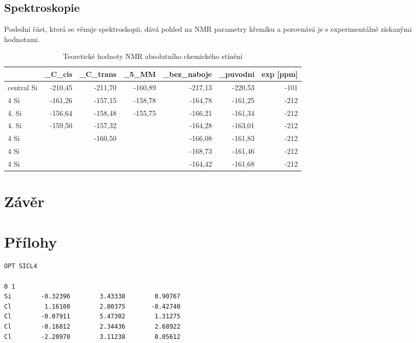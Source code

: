 \documentclass[
  digital, %
  table,   %
  lof,     %
  lot,     %
  oneside,
]{fithesis3}
\begin{document}
\section{Spektroskopie}
 Poslední část, která se věnuje spektroskopii, dává pohled na NMR parametry křemíku a porovnává je s experimentálně získanými hodnotami.
\begin{table}[htbp]
\caption{Teoretické hodnoty NMR absolutního chemického stínění \cite{1316862}}
\begin{center}
\begin{tabular}{|l|l|r|l|r|r|r|}
\hline
 & \_C\_cis & \multicolumn{1}{l|}{\_C\_trans} &\_5\_MM & \multicolumn{1}{l|}{\_bez\_naboje} & \multicolumn{1}{l|}{\_puvodni} & \multicolumn{1}{l|}{exp [ppm]} \\ \hline
central Si & \multicolumn{1}{r|}{-210,45} & -211,70 & \multicolumn{1}{r|}{-160,89} & -217,13 & -220,53 & -101 \\ \hline
4 Si & \multicolumn{1}{r|}{-161,26} & -157,15 & \multicolumn{1}{r|}{-158,78} & -164,78 & -161,25 & -212 \\ \hline
4. Si & \multicolumn{1}{r|}{-156,64} & -158,48 & \multicolumn{1}{r|}{-155,75} & -166,21 & -161,34 & -212 \\ \hline
4. Si & \multicolumn{1}{r|}{-159,50} & -157,32 &  & -164,28 & -163,01 & -212 \\ \hline
4 Si &  & -160,50 &  & -166,08 & -161,83 & -212 \\ \hline
4 Si &  & \multicolumn{1}{l|}{} &  & -168,73 & -161,46 & -212 \\ \hline
4 Si &  & \multicolumn{1}{l|}{} &  & -164,42 & -161,68 & -212 \\ \hline
\end{tabular}
\end{center}
\label{nmr}
\end{table}












\chapter{Závěr}

\chapter{Přílohy}
 \begin{lstlisting}[frame=single, caption={\ce{SiCl4} },label=DescriptiveLabel]
OPT SICL4

0 1
Si        -0.32396        3.43338        0.90767
Cl         1.16108        2.80375       -0.42740
Cl        -0.07911        5.47302        1.31275
Cl        -0.16812        2.34436        2.68922
Cl        -2.20970        3.11238        0.05612
 \end{lstlisting}
\end{document}
